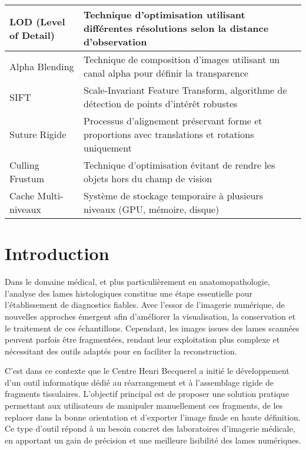 \documentclass[12pt,a4paper]{report}
\let\oldchapter\chapter
\renewcommand{\chapter}{\clearpage\oldchapter}
\begin{document}
\begin{longtable}{|p{4cm}|p{10cm}|}
LOD (Level of Detail) & Technique d'optimisation utilisant différentes résolutions selon la distance d'observation \\
\hline

Alpha Blending & Technique de composition d'images utilisant un canal alpha pour définir la transparence \\
\hline

SIFT & Scale-Invariant Feature Transform, algorithme de détection de points d'intérêt robustes \\
\hline

Suture Rigide & Processus d'alignement préservant forme et proportions avec translations et rotations uniquement \\
\hline

Culling Frustum & Technique d'optimisation évitant de rendre les objets hors du champ de vision \\
\hline

Cache Multi-niveaux & Système de stockage temporaire à plusieurs niveaux (GPU, mémoire, disque) \\
\hline

\end{longtable}

\chapter*{Introduction}

Dans le domaine médical, et plus particulièrement en anatomopathologie, l'analyse des lames histologiques constitue une étape essentielle pour l'établissement de diagnostics fiables. Avec l'essor de l'imagerie numérique, de nouvelles approches émergent afin d'améliorer la visualisation, la conservation et le traitement de ces échantillons. Cependant, les images issues des lames scannées peuvent parfois être fragmentées, rendant leur exploitation plus complexe et nécessitant des outils adaptés pour en faciliter la reconstruction.

C'est dans ce contexte que le Centre Henri Becquerel a initié le développement d'un outil informatique dédié au réarrangement et à l'assemblage rigide de fragments tissulaires. L'objectif principal est de proposer une solution pratique permettant aux utilisateurs de manipuler manuellement ces fragments, de les replacer dans la bonne orientation et d'exporter l'image finale en haute définition. Ce type d'outil répond à un besoin concret des laboratoires d'imagerie médicale, en apportant un gain de précision et une meilleure lisibilité des lames numériques.
\end{document}
